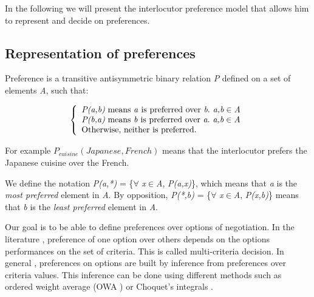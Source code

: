 \documentclass{llncs}
\begin{document}
In the following we will present the interlocutor preference model that allows him to represent and decide on preferences.

\subsection{Representation of preferences}

 Preference is a transitive antisymmetric binary relation \emph{P} defined on a set of elements \emph{A}, such that:
 
 \[ \left \{
     \begin{array}{l}
 	\emph{P(a,b)} $ means \emph{a}  is preferred over $\emph{b}. \emph{ a,b} \in \emph{A}\\
 	\emph{P(b,a)} $ means  \emph{b} is preferred over $\emph{a}. \emph{ a,b} \in \emph{A}\\
 $Otherwise, neither is preferred. $\\
     \end{array}
    \right .\]

For example $P_{cuisine} (Japanese, French)$ means that the interlocutor prefers the Japanese cuisine over the French. 

\par  We define the notation \emph{P(a,*)}  = \{$\forall$ \emph{x}$\in$\emph{A}, \emph{P(a,x)}\}, which means that \emph{a} is the \textit{most preferred} element in \emph{A}. 
By opposition, \emph{P(*,b)} = \{$\forall$ \emph{x}$\in$\emph{A}, \emph{P(x,b)}\} means that \emph{b} is the \textit{least preferred} element in \emph{A}.


 
\par Our goal is to be able to define preferences over options of negotiation. 
In the literature \cite{dodgson2009multi}, preference of one option over others depends on the options performances on the set of criteria. This is called multi-criteria decision. In general \cite{dodgson2009multi}, preferences on options are built by inference from preferences over criteria values. This inference can be done using different methods such as ordered weight average (OWA \cite{yager2012ordered}) or Choquet's integrals \cite{chouquet1953}.
\end{document}
